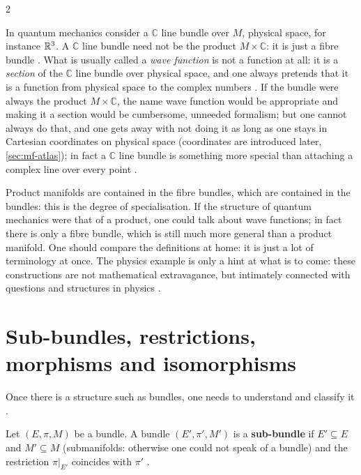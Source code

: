 \begin{paracol}{2}
\begin{example}\label{ex:mf-wave}
In quantum mechanics consider a $\mathbb C$ line bundle over $M$, physical space, for instance $\mathbb{R}^3$. A $\mathbb C$ line bundle need not be the product $M\times\mathbb C$: it is just a fibre bundle . What is usually called a \emph{wave function} is not a function at all:
it is a \emph{section} of the $\mathbb C$ line bundle over physical space, and one always pretends that it is a function from physical space to the complex numbers . If the bundle were always the product $M\times\mathbb C$, the name wave function would be
appropriate and making it a section would be cumbersome, unneeded formalism; but one cannot always do that, and one gets away with not doing it as long as one stays in Cartesian coordinates on physical space (coordinates are introduced later, \cref{sec:mf-atlas}); in fact a $\mathbb C$ line bundle is something more special than
attaching a complex line over every point .
\end{example}
\begin{intuition}\label{int:mf-hierarchy}
Product manifolds are contained in the fibre bundles, which are contained in the bundles: this is the degree of specialisation. If the structure of quantum mechanics were that of a product, one could talk about wave functions; in fact there is only a fibre bundle, which is still much more general
than a product manifold. One should compare the definitions at home: it is just a lot of terminology at once. The physics example is only a hint at what is to come: these constructions are not mathematical extravagance, but intimately connected with questions and structures in physics
.
\end{intuition}

\section{Sub-bundles, restrictions, morphisms and isomorphisms}\label{sec:mf-morph}

Once there is a structure such as bundles, one needs to understand and classify it .

\begin{definition}\label{def:mf-subbundle}
Let $(E,\pi,M)$ be a bundle. A bundle $(E',\pi',M')$ is a \textbf{sub-bundle} if $E'\subseteq E$ and $M'\subseteq M$ (submanifolds: otherwise one could not speak of a bundle) and the restriction $\pi|_{E'}$ coincides with $\pi'$
.
\end{definition}


\end{paracol}
